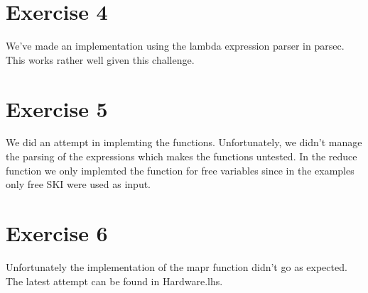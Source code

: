 \documentclass{article}
\begin{document}
\section*{Exercise 4}
We've made an implementation using the lambda expression parser in parsec. This works rather well given this challenge.
\section*{Exercise 5}
We did an attempt in implemting the functions. Unfortunately, we didn't manage the parsing of the expressions which makes the functions untested. In the reduce function we only implemted the function for free variables since in the examples only free SKI were used as input.

\section*{Exercise 6}
Unfortunately the implementation of the mapr function didn't go as expected. The latest attempt can be found in Hardware.lhs.
\end{document}
